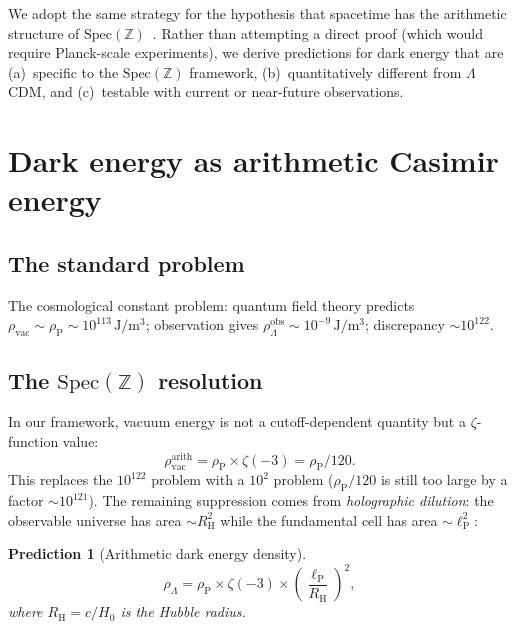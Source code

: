 \documentclass[11pt,a4paper]{article}
\newtheorem{prediction}[theorem]{Prediction}
\newcommand{\Spec}{\mathrm{Spec}}
\newcommand{\lP}{\ell_{\mathrm{P}}}
\newcommand{\RH}{R_{\mathrm{H}}}
\newcommand{\rhoP}{\rho_{\mathrm{P}}}
\begin{document}
We adopt the same strategy for the hypothesis that spacetime has
the arithmetic structure of $\Spec(\mathbb{Z})$~\cite{paper_A,paper_F}.
Rather than attempting a direct proof (which would require
Planck-scale experiments), we derive predictions for dark energy
that are (a)~specific to the $\Spec(\mathbb{Z})$ framework,
(b)~quantitatively different from $\Lambda$CDM, and
(c)~testable with current or near-future observations.

\section{Dark energy as arithmetic Casimir energy}

\subsection{The standard problem}

The cosmological constant problem: quantum field theory predicts
$\rho_{\mathrm{vac}} \sim \rhoP \sim 10^{113}\,\mathrm{J/m^3}$;
observation gives
$\rho_\Lambda^{\mathrm{obs}} \sim 10^{-9}\,\mathrm{J/m^3}$;
discrepancy $\sim 10^{122}$.

\subsection{The $\Spec(\mathbb{Z})$ resolution}

In our framework, vacuum energy is not a cutoff-dependent quantity
but a $\zeta$-function value:
\begin{equation}
  \rho_{\mathrm{vac}}^{\mathrm{arith}} = \rhoP \times \zeta(-3)
  = \rhoP / 120.
\end{equation}
This replaces the $10^{122}$ problem with a
$10^{2}$ problem ($\rhoP / 120$ is still too large by a factor
$\sim 10^{121}$). The remaining suppression comes from
\emph{holographic dilution}: the observable universe has area
$\sim \RH^2$ while the fundamental cell has area $\sim \lP^2$:

\begin{prediction}[Arithmetic dark energy density]
\label{pred:density}
\begin{equation}
  \rho_\Lambda = \rhoP \times \zeta(-3) \times \left(\frac{\lP}{\RH}\right)^2,
  \label{eq:rho_lambda}
\end{equation}
where $\RH = c/H_0$ is the Hubble radius.
\end{prediction}
\end{document}
